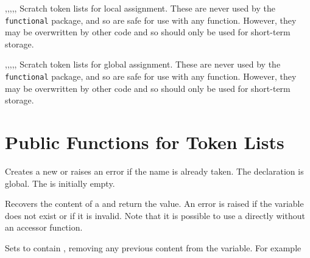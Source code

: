 \documentclass[oneside]{book}
\begin{document}
\begin{variable}{\lTmpaTl,\lTmpbTl,\lTmpcTl,\lTmpiTl,\lTmpjTl,\lTmpkTl}
Scratch token lists for local assignment. These are never used by
the \verb!functional! package, and so are safe for use with any
function. However, they may be overwritten by other
code and so should only be used for short-term storage.
\end{variable}

\begin{variable}{\gTmpaTl,\gTmpbTl,\gTmpcTl,\gTmpiTl,\gTmpjTl,\gTmpkTl}
Scratch token lists for global assignment. These are never used by
the \verb!functional! package, and so are safe for use with any
function. However, they may be overwritten by other
code and so should only be used for short-term storage.
\end{variable}

\section{Public Functions for Token Lists}

\begin{function}{\TlNew}
\begin{syntax}
 
\end{syntax}
Creates a new  or raises an error if the
name is already taken. The declaration is global. The
 is initially empty.
\end{function}

\begin{function}{\TlUse}
\begin{syntax}
 
\end{syntax}
Recovers the content of a  and return the value.
An error is raised if the variable
does not exist or if it is invalid. Note that it is possible to use
a  directly without an accessor function.
\end{function}

\begin{function}{\TlSet}
\begin{syntax}
  
\end{syntax}
Sets  to contain ,
removing any previous content from the variable. For example
\begin{demo}
\TlSet{}
\TlUse\lTmpiTl
\end{demo}
\end{function}
\end{document}
